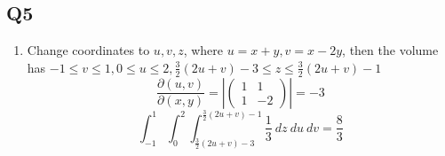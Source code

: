 \documentclass{article}
\newcommand{\p}[2]{\frac{\partial #1}{\partial #2}}
\newcommand{\abs}[1]{\left| #1 \right|}
\begin{document}
\subsection*{Q5}

\begin{enumerate}[label=\alph*.]
\item Change coordinates to $u,v,z$, where $u=x+y, v=x-2y$, then the volume has $-1 \leq v \leq 1, 0 \leq u \leq 2, \frac{3}{2}(2u+v) -3 \leq z \leq \frac{3}{2}(2u+v) -1$
\[\p{(u,v)}{(x,y)} = \abs{\begin{pmatrix}
1 & 1 \\ 1 & -2
\end{pmatrix}} = -3\]
\[
\int_{-1}^1 \int_0^2 \int_{\frac{3}{2}(2u+v)-3}^{\frac{3}{2}(2u+v) -1} \frac{1}{3}\ dz\ du\ dv = \frac{8}{3}
\]
\end{enumerate}
\end{document}
